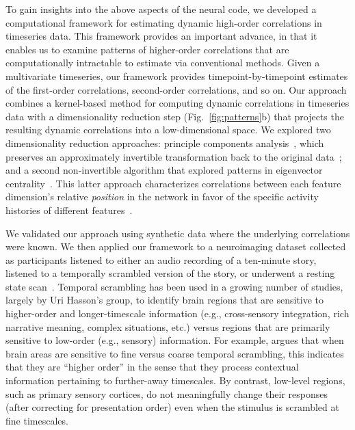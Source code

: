 \documentclass[english]{article}
\begin{document}
To gain insights into the above aspects of the neural code, we
developed a computational framework for estimating dynamic high-order
correlations in timeseries data. This framework provides an important
advance, in that it enables us to examine patterns of higher-order
correlations that are computationally intractable to estimate via
conventional methods.  Given a multivariate timeseries, our framework
provides timepoint-by-timepoint estimates of the first-order
correlations, second-order correlations, and so on.  Our approach
combines a kernel-based method for computing dynamic correlations in
timeseries data with a dimensionality reduction step
(Fig.~\ref{fig:patterns}b) that projects the resulting dynamic
correlations into a low-dimensional space.  We explored two
dimensionality reduction approaches: principle components
analysis~\citep[PCA;][]{Pear01}, which preserves an approximately
invertible transformation back to the original data~\citep[e.g., this
follows related approaches taken by][]{McInJirs19, TokeSomm19,
  GonzEtal19}; and a second non-invertible algorithm that explored
patterns in eigenvector centrality~\citep{Land95}.  This latter
approach characterizes correlations between each feature dimension's
relative \textit{position} in the network in favor of the specific
activity histories of different features~\citep[also
see][]{BetzEtal19, SizeEtal18, ReimEtal17}.

We validated our approach using synthetic data where the underlying
correlations were known.  We then applied our framework to a
neuroimaging dataset collected as participants listened to either an
audio recording of a ten-minute story, listened to a temporally
scrambled version of the story, or underwent a resting state
scan~\citep{SimoEtal16}.  Temporal scrambling has been used in a
growing number of studies, largely by Uri Hasson's group, to identify
brain regions that are sensitive to higher-order and longer-timescale
information (e.g., cross-sensory integration, rich narrative meaning,
complex situations, etc.) versus regions that are primarily sensitive
to low-order (e.g., sensory) information.  For example,
\cite{HassEtal08} argues that when brain areas are sensitive to fine
versus coarse temporal scrambling, this indicates that they are
``higher order'' in the sense that they process contextual information
pertaining to further-away timescales.  By contrast, low-level
regions, such as primary sensory cortices, do not meaningfully change
their responses (after correcting for presentation order) even when
the stimulus is scrambled at fine timescales.
\end{document}
